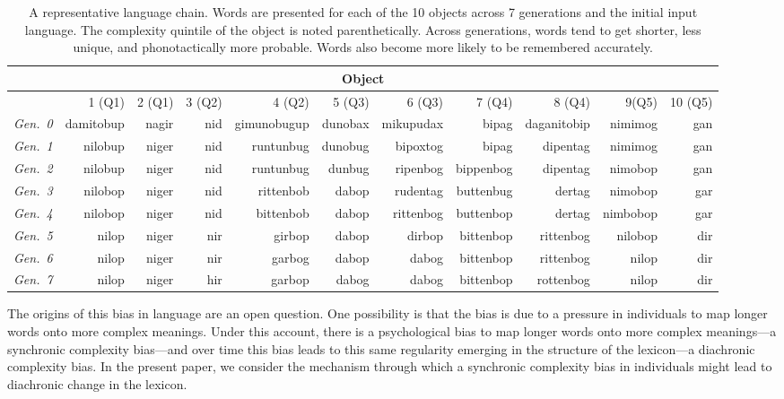


\begin{table}[t]
 \footnotesize
\centering
\begin{tabular}{c rrrrrrrrrr}
\hline
 \multicolumn{11}{c}{Object} \\
 \hline

 \rule{0pt}{2ex}    
& 1 (Q1) & 2 (Q1) & 3 (Q2) & 4 (Q2) & 5 (Q3) & 6 (Q3) & 7 (Q4) & 8 (Q4) & 9(Q5) & 10 (Q5) \\ 
 \hline
    {\it Gen.\ 0} & damitobup & nagir & nid & gimunobugup & dunobax & mikupudax & bipag & daganitobip & nimimog & gan \\ 
   {\it Gen.\ 1}& nilobup & niger & nid & runtunbug & dunobug & bipoxtog & bipag & dipentag & nimimog & gan \\ 
    {\it Gen.\ 2} & nilobup & niger & nid & runtunbug & dunbug & ripenbog & bippenbog & dipentag & nimobop & gan \\ 
  {\it Gen.\ 3} & nilobop & niger & nid & rittenbob & dabop & rudentag & buttenbug & dertag & nimobop & gar \\ 
   {\it Gen.\ 4} & nilobop & niger & nid & bittenbob & dabop & rittenbog & buttenbop & dertag & nimbobop & gar \\ 
    {\it Gen.\ 5}  & nilop & niger & nir & girbop & dabop & dirbop & bittenbop & rittenbog & nilobop & dir \\ 
   {\it Gen.\ 6}& nilop & niger & nir & garbog & dabop & dabog & bittenbop & rittenbog & nilop & dir \\
   {\it Gen.\ 7}& nilop & niger & hir & garbop & dabog & dabog & bittenbop & rottenbog & nilop & dir \\ 
\hline
\end{tabular}
\caption{A representative language chain. Words are presented for each of the 10 objects across 7 generations and the initial input language. The complexity quintile of the object is noted parenthetically. Across generations, words tend to get shorter, less unique, and phonotactically more probable. Words also become more likely to be remembered accurately.}
\label{tab:ex}
\end{table}
\normalsize




The origins of this bias  in language are an open question. One possibility is that the bias is due to a pressure in individuals to map longer words onto more complex meanings. Under this account, there is a psychological bias to map longer words onto more complex meanings---a synchronic complexity bias---and over time this bias leads to this same regularity emerging in the structure of the lexicon---a diachronic complexity bias. In the present paper, we consider the mechanism through which a synchronic complexity bias in individuals might lead to diachronic change in the lexicon.  

